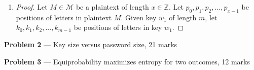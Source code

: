\documentclass[11pt]{article}
\newcommand{\K}{\mathcal{K}}
\newcommand{\M}{\mathcal{M}}
\newcommand{\Z}{\mathbb{Z}}
\theoremstyle{definition}
\begin{document}
\begin{enumerate}
\begin{enumerate}
\begin{proof}
\begin{enumerate}
              Let: \\
              \begin{equation} \label{eq:p1_induction_hyp}
              \begin{aligned}
                K^{'} &= \sum^m_{\substack{K_i \in \K \\ i = 1}} K_i \\
                C &\equiv (M + K^{'}) \mod 26
              \end{aligned}
              \end{equation}
              Still results in a shift cipher, according to definition.
            \item
              Inductive case: According to induction hypothesis, we can show that $m + 1$ holds true as well:
              \begin{align*}
                C &\equiv (M + \sum^{m + 1}_{\substack{K_i \in \K \\ i = 1}} K_i) \mod 26 \\
                C &\equiv (M + (\sum^{m}_{\substack{K_i \in \K \\ i = 1}} K_i + \sum^{1}_{\substack{K_i \in \K \\ i = 1}} K_i)) \mod 26 \\
                C &\equiv (M + (\sum^{m}_{\substack{K_i \in \K \\ i = 1}} K_i + K_1)) \mod 26 \\
                C &\equiv (M + (K^{'} + K_1)) \mod 26 \\
                C &\equiv (M + K^{"}) \mod 26 \\
              \end{align*}
              where $K_1$ is our base case \eqref{eq:p1_base_case} and $K^{'}$ is our induction hypothesis \eqref{eq:p1_induction_hyp}. Since $K_1 \in \K$ and $K^{'} \in \K$, therefore $K^{"} = K_1 + K^{'}, K^{"} \in \K$. Hence, the key of multiple encipherment is sum of all given keys.
          \end{enumerate}
        \end{proof}
    \end{enumerate}

  \item
    \begin{proof}
      Let $M \in \M$ be a plaintext of length $x \in \Z$. Let $p_0, p_1, p_2, ...,p_{x - 1}$ be positions of letters in plaintext $M$. Given key $w_1$ of length $m$, let $k_0, k_1, k_2, ...,k_{m - 1}$ be positions of letters in key $w_1$.
    \end{proof}
\end{enumerate}

\newpage

\item[] \textbf{Problem 2} --- Key size versus password size, 21 marks

\newpage

\item[] \textbf{Problem 3} --- Equiprobability maximizes entropy for two outcomes, 12 marks
\end{document}

